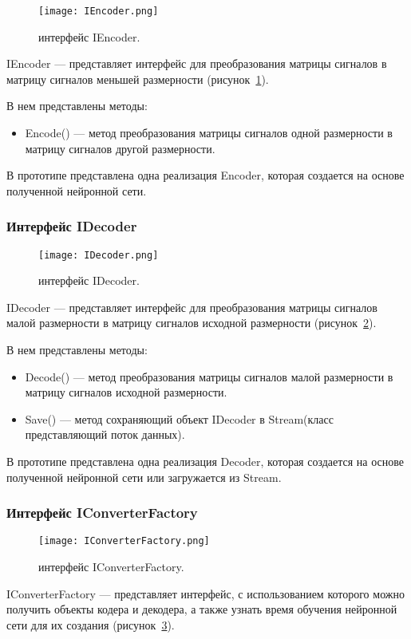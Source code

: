 \begin{figure}[ht]
\centering
  \texttt{[image: IEncoder.png]}
  \caption{ интерфейс IEncoder. }
  \label{fig:iencoder}
\end{figure}
IEncoder --- представляет интерфейс для преобразования матрицы сигналов в матрицу сигналов меньшей размерности (рисунок~\ref{fig:iencoder}).

В нем представлены методы:
\begin{itemize}
  \item Encode() --- метод преобразования матрицы сигналов одной размерности в матрицу сигналов другой размерности.
\end{itemize}

В прототипе представлена одна реализация Encoder, которая создается на основе полученной нейронной сети.

\subsubsection{Интерфейс IDecoder}
\label{subsub:development:types:idecoder}

\begin{figure}[ht]
\centering
  \texttt{[image: IDecoder.png]}
  \caption{ интерфейс IDecoder. }
  \label{fig:idecoder}
\end{figure}
IDecoder --- представляет интерфейс для преобразования матрицы сигналов малой размерности в матрицу сигналов исходной размерности (рисунок~\ref{fig:idecoder}).

В нем представлены методы:
\begin{itemize}
  \item Decode() --- метод преобразования матрицы сигналов малой размерности в матрицу сигналов исходной размерности.
  \item Save() --- метод сохраняющий объект IDecoder в Stream(класс представляющий поток данных).
\end{itemize}

В прототипе представлена одна реализация Decoder, которая создается на основе полученной нейронной сети или загружается из Stream.

\subsubsection{Интерфейс IConverterFactory}
\label{subsub:development:types:iconverterfactory}

\begin{figure}[ht]
\centering
  \texttt{[image: IConverterFactory.png]}
  \caption{ интерфейс IConverterFactory. }
  \label{fig:iconverterfactory}
\end{figure}
IConverterFactory --- представляет интерфейс, с использованием которого можно получить объекты кодера и декодера,
а также узнать время обучения нейронной сети для их создания (рисунок~\ref{fig:iconverterfactory}).

